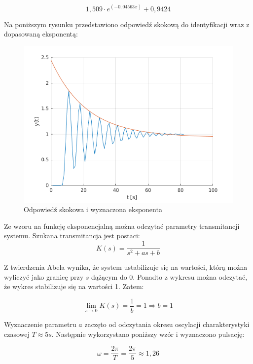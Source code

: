 \documentclass[12pt]{article}
\begin{document}
\begin{equation}
    1,509 \cdot e^{(-0,04563x)} +0,9424
\end{equation}

Na poniższym rysunku przedstawiono odpowiedź skokową do identyfikacji wraz z dopasowaną eksponentą:

\begin{figure}[H]
    \centering
    \includegraphics[width=12cm]{curve.png}
    \caption{Odpowiedź skokowa i wyznaczona eksponenta}
\end{figure}

Ze wzoru na funkcję eksponencjalną można odczytać parametry transmitancji systemu. Szukana transmitancja jest postaci:
\begin{equation}
        K(s) = \frac{1}{s^2+as+b}
\end{equation}

Z twierdzenia Abela wynika, że system ustabilizuje się na wartości, którą można wyliczyć jako granicę przy $s$ dążącym do 0. Ponadto z wykresu można odczytać, że wykres stabilizuje się na wartości 1. Zatem:

\begin{equation*}
    \lim_{s \to 0} K(s) = \frac{1}{b} = 1 \Longrightarrow b =1
\end{equation*}

Wyznaczenie parametru $a$ zaczęto od odczytania okresu oscylacji charakterystyki czasowej $T \approx 5 s$. Następnie wykorzystano poniższy wzór i wyznaczono pulsację:

\begin{equation*}
    \omega = \frac{2 \pi}{T} = \frac{2 \pi}{5} \approx 1,26
\end{equation*}
\end{document}
